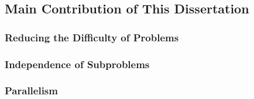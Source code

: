 \subsection{Main Contribution of This Dissertation}
\label{subsec:advantages}

\subsubsection{Reducing the Difficulty of Problems}

\subsubsection{Independence of Subproblems}

\subsubsection{Parallelism}


